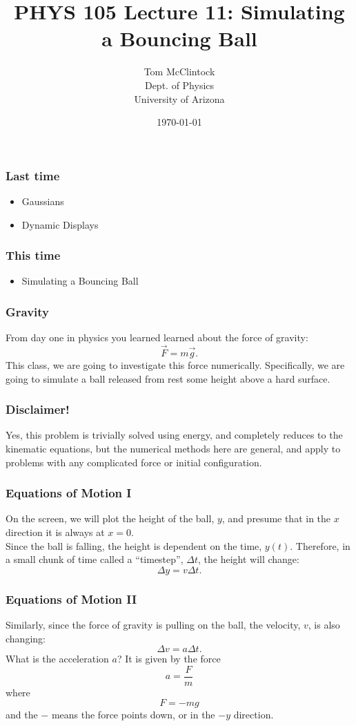 \documentclass{beamer}
\title{PHYS 105 Lecture 11: Simulating a Bouncing Ball}
\author{Tom McClintock \\
	Dept. of Physics\\
	University of Arizona
}
\date{\today}
\begin{document}
\begin{frame}
  \titlepage
\end{frame}

\begin{frame}
  \frametitle{Last time}
  \begin{itemize}
    \item Gaussians
    \item Dynamic Displays
  \end{itemize}
\end{frame}

\begin{frame}
  \frametitle{This time}
  \begin{itemize}
    \item Simulating a Bouncing Ball
  \end{itemize}
\end{frame}

\begin{frame}
  \frametitle{Gravity}
  From day one in physics you learned learned about the force of gravity:
  \begin{equation*}
    \vec{F} = m\vec{g}.
  \end{equation*}
  This class, we are going to investigate this force numerically. 
  Specifically, we are going to simulate a ball released from rest some height
  above a hard surface.
\end{frame}

\begin{frame}
  \frametitle{Disclaimer!}
  Yes, this problem is trivially solved using energy, and
  completely reduces to the kinematic equations, but the 
  numerical methods here are general, and apply to problems with
  any complicated force or initial configuration.
\end{frame}

\begin{frame}
  \frametitle{Equations of Motion I}
  On the screen, we will plot the height of the ball, $y$,
  and presume that in the $x$ direction it is always at $x=0$.\\
  Since the ball is falling, the height is dependent on the time, $y(t)$.
  Therefore, in a small chunk of time called a ``timestep'', $\Delta t$,
  the height will change:
  \begin{equation*}
    \Delta y = v\Delta t.
  \end{equation*}
\end{frame}

\begin{frame}
  \frametitle{Equations of Motion II}
  Similarly, since the force of gravity is pulling on the ball,
  the velocity, $v$, is also changing:
  \begin{equation*}
    \Delta v = a\Delta t.
  \end{equation*}
  What is the acceleration $a$? It is given by the force
  \begin{equation*}
    a = \frac{F}{m}
  \end{equation*}
  where
  \begin{equation*}
    F = -mg
  \end{equation*}
  and the $-$ means the force points down, or in the $-y$ direction.
\end{frame}
\end{document}
